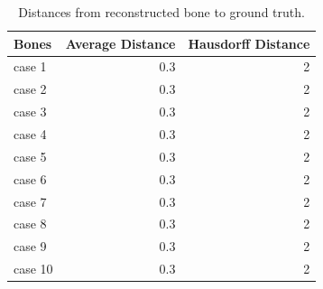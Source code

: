 \begin{table}
  \centering
  \caption{Distances from reconstructed bone to ground truth.}
  \label{tbl:reconstructed_distance}
  \begin{tabular}{lrr}
    \toprule
    \textbf{Bones} &
      Average Distance &
      Hausdorff Distance \\
    \midrule
      case 1& 0.3 & 2 \\
      case 2& 0.3 & 2 \\
      case 3& 0.3 & 2 \\
      case 4& 0.3 & 2 \\
      case 5& 0.3 & 2 \\
      case 6& 0.3 & 2 \\
      case 7& 0.3 & 2 \\
      case 8& 0.3 & 2 \\
      case 9& 0.3 & 2 \\
      case 10& 0.3 & 2 \\
    \bottomrule
  \end{tabular}
\end{table}